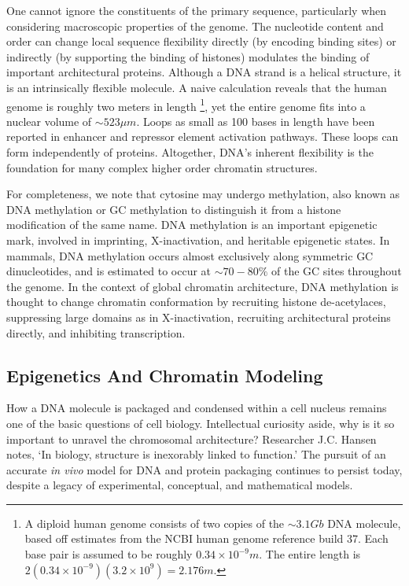 One cannot ignore the constituents of the primary sequence, particularly when considering macroscopic properties of the genome.  The nucleotide content and
order can change local sequence flexibility directly (by encoding binding sites) or indirectly (by supporting the binding of histones)
modulates the binding of important architectural proteins\cite{travers2004}.  Although a \gls{DNA} strand is a helical structure, it is an intrinsically
flexible molecule.  A naive calculation reveals that the human genome is roughly two meters in length%
\footnote{%
  A diploid human genome consists of two copies of the $\sim3.1Gb$ DNA molecule, based off estimates from the \gls{NCBI} human genome reference build 37.
  Each base pair is assumed to be roughly $0.34\times10^{-9}m$.  The entire length is $2(0.34 \times 10^{-9})(3.2 \times 10^9) = 2.176m$.
},
yet the entire genome fits into a nuclear volume of $\sim523\mu{}m$\cite{marks2011}.  Loops as small as 100 bases in length have been
reported in enhancer and repressor element activation pathways\cite{wong2008}. These loops can form independently of proteins\cite{vafabakhsh2012}.
Altogether, \gls{DNA}'s inherent flexibility is the foundation for  many complex higher order chromatin structures.

For completeness, we note that cytosine may undergo methylation, also known as \gls{DNA} methylation or GC methylation to distinguish it
from a histone modification of the same name\cite{bird2002}.  \gls{DNA} methylation is an important epigenetic mark, involved in imprinting,
\gls{X-inactivation}, and heritable epigenetic states\cite{law2010}.  In mammals, \gls{DNA} methylation occurs almost exclusively along
symmetric \gls{GC} dinucleotides, and is estimated to occur at $\sim70-80\%$ of the \gls{GC} sites throughout the genome\cite{ehrlich1982,law2010}.
In the context of global chromatin architecture, \gls{DNA} methylation is thought to change chromatin conformation by recruiting histone
de-acetylaces\cite{schubeler2000}, suppressing large domains as in X-inactivation, recruiting architectural proteins directly\cite{yu2000},
and inhibiting transcription\cite{kass1997}.

\subsection*{Epigenetics And Chromatin Modeling}

How a \gls{DNA} molecule is packaged and condensed within a cell nucleus remains one of the basic questions of cell biology.  Intellectual curiosity aside,
why is it so important to unravel the chromosomal architecture?  Researcher J.C. Hansen notes, `In biology, structure is inexorably linked to function.'\cite{hansen2012}
The pursuit of an accurate \textit{\gls{in vivo}} model for \gls{DNA} and protein packaging continues to persist today, despite a legacy of experimental,
conceptual, and mathematical models.

